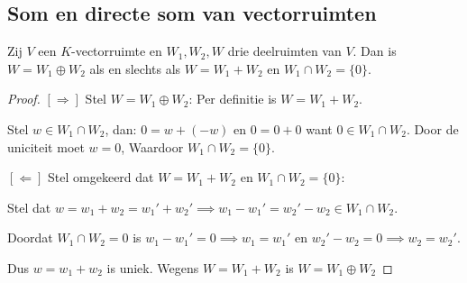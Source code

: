 \subsection{Som en directe som van vectorruimten}

\begin{lemma}[2.5.2]
    Zij $V$ een $K$-vectorruimte en $W_1, W_2, W$ drie deelruimten van $V$. Dan is $W = W_1 \oplus W_2$ als en slechts als $W = W_1 + W_2$ en $W_1 \cap W_2 = \{0\}$.
\end{lemma}
\begin{proof}
    \([\Rightarrow]\) Stel \(W =W_1 \oplus W_2\):
    Per definitie is \(W = W_1 + W_2\).

    Stel \(w \in W_1 \cap W_2\), dan:
    \(0 = w + (-w)\) en \(0 = 0 + 0\) want \(0 \in W_1 \cap W_2 \).
    Door de uniciteit moet \(w=0\),
    Waardoor  \(W_1 \cap W_2 = \{0\} \).

    \([\Leftarrow]\) Stel omgekeerd dat $W = W_1 + W_2$ en $W_1 \cap W_2 = \{0\}$:

    Stel dat \(w = w_1 + w_2 = w_1' + w_2' \implies w_1 - w_1' = w_2' - w_2 \in W_1 \cap W_2\).

    Doordat \( W_1 \cap W_2 = 0\) is \(w_1 - w_1' =0 \implies w_1 = w_1'\) en \( w_2' - w_2= 0 \implies w_2 = w_2'\).
    
    Dus \(w = w_1 + w_2\) is uniek.
    Wegens \(W = W_1 + W_2\) is \(W = W_1 \oplus W_2\)
\end{proof}


